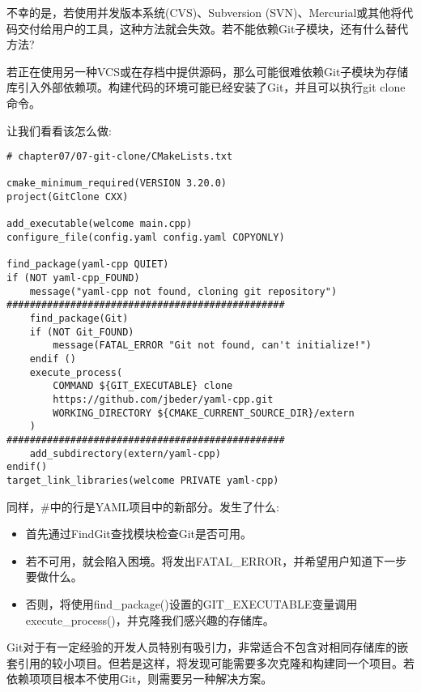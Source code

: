 不幸的是，若使用并发版本系统(CVS)、Subversion (SVN)、Mercurial或其他将代码交付给用户的工具，这种方法就会失效。若不能依赖Git子模块，还有什么替代方法?


若正在使用另一种VCS或在存档中提供源码，那么可能很难依赖Git子模块为存储库引入外部依赖项。构建代码的环境可能已经安装了Git，并且可以执行git clone命令。

让我们看看该怎么做:

\begin{lstlisting}[style=styleCMake]
# chapter07/07-git-clone/CMakeLists.txt

cmake_minimum_required(VERSION 3.20.0)
project(GitClone CXX)

add_executable(welcome main.cpp)
configure_file(config.yaml config.yaml COPYONLY)

find_package(yaml-cpp QUIET)
if (NOT yaml-cpp_FOUND)
	message("yaml-cpp not found, cloning git repository")
################################################
	find_package(Git)
	if (NOT Git_FOUND)
		message(FATAL_ERROR "Git not found, can't initialize!")
	endif ()
	execute_process(
		COMMAND ${GIT_EXECUTABLE} clone
		https://github.com/jbeder/yaml-cpp.git
		WORKING_DIRECTORY ${CMAKE_CURRENT_SOURCE_DIR}/extern
	)
################################################
	add_subdirectory(extern/yaml-cpp)
endif()
target_link_libraries(welcome PRIVATE yaml-cpp)
\end{lstlisting}

同样，\#中的行是YAML项目中的新部分。发生了什么:

\begin{itemize}
\item 
首先通过FindGit查找模块检查Git是否可用。

\item 
若不可用，就会陷入困境。将发出FATAL\_ERROR，并希望用户知道下一步要做什么。

\item 
否则，将使用find\_package()设置的GIT\_EXECUTABLE变量调用execute\_process()，并克隆我们感兴趣的存储库。
\end{itemize}

Git对于有一定经验的开发人员特别有吸引力，非常适合不包含对相同存储库的嵌套引用的较小项目。但若是这样，将发现可能需要多次克隆和构建同一个项目。若依赖项项目根本不使用Git，则需要另一种解决方案。




















